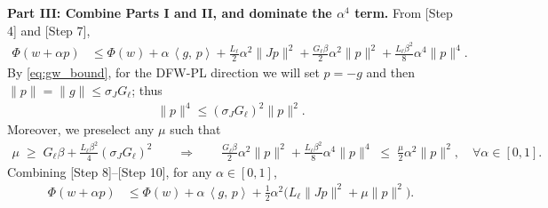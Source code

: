 \documentclass[11pt]{article}
\newcommand{\inner}[2]{\left\langle #1,\, #2 \right\rangle}
\begin{document}
\noindent\textbf{Part III: Combine Parts I and II, and dominate the $\alpha^4$ term.}
From [Step 4] and [Step 7],
\begin{align}
\Phi(w+\alpha p) 
&\le \Phi(w) + \alpha\,\inner{g}{p} + \frac{L_\ell}{2}\alpha^2 \|J p\|^2 + \frac{G_\ell \beta}{2}\alpha^2\|p\|^2 + \frac{L_\ell \beta^2}{8}\alpha^4\|p\|^4. \tag*{[Step 8]}
\end{align}
By \eqref{eq:gw_bound}, for the DFW-PL direction we will set $p=-g$ and then $\|p\|=\|g\|\le \sigma_J G_\ell$; thus
\begin{align}
\|p\|^4 \le (\sigma_J G_\ell)^2 \|p\|^2. \tag*{[Step 9]}
\end{align}
Moreover, we preselect any $\mu$ such that
\begin{align}
\mu \;\ge\; G_\ell \beta + \frac{L_\ell \beta^2}{4}(\sigma_J G_\ell)^2 \qquad\Longrightarrow\qquad
\frac{G_\ell \beta}{2}\alpha^2\|p\|^2 + \frac{L_\ell \beta^2}{8}\alpha^4\|p\|^4 \;\le\; \frac{\mu}{2}\alpha^2\|p\|^2, \quad \forall \alpha\in[0,1]. \tag*{[Step 10]}
\end{align}
Combining [Step 8]--[Step 10], for any $\alpha\in[0,1]$,
\begin{align}
\Phi(w+\alpha p) 
&\le \Phi(w) + \alpha\,\inner{g}{p} + \frac{1}{2}\alpha^2\Big(L_\ell \|J p\|^2 + \mu \|p\|^2\Big). \tag*{[Step 11]}
\end{align}
\end{document}
